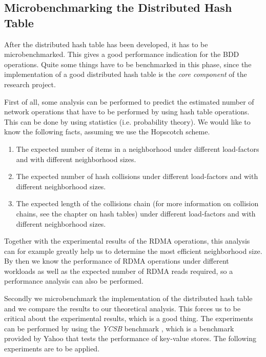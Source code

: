 \subsection{Microbenchmarking the Distributed Hash Table}
After the distributed hash table has been developed, it has to be microbenchmarked. This gives a good performance indication for the BDD operations. Quite some things have to be benchmarked in this phase, since the implementation of a good distributed hash table is the \emph{core component} of the research project. 

First of all, some analysis can be performed to predict the estimated number of network operations that have to be performed by using hash table operations. This can be done by using statistics (i.e. probability theory). We would like to know the following facts, assuming we use the Hopscotch scheme.

\begin{enumerate}
	\item The expected number of items in a neighborhood under different load-factors and with different neighborhood sizes.
	\item The expected number of hash collisions under different load-factors and with different neighborhood sizes.
	\item The expected length of the collisions chain (for more information on collision chains, see the chapter on hash tables) under different load-factors and with different neighborhood sizes.
\end{enumerate}

Together with the experimental results of the RDMA operations, this analysis can for example greatly help us to determine the most efficient neighborhood size. By then we know the performance of RDMA operations under different workloads as well as the expected number of RDMA reads required, so a performance analysis can also be performed.

Secondly we microbenchmark the implementation of the distributed hash table and we compare the results to our theoretical analysis. This forces us to be critical about the experimental results, which is a good thing. The experiments can be performed by using the \emph{YCSB} benchmark \cite{cooper2010benchmarking}, which is a benchmark provided by Yahoo that tests the performance of key-value stores. The following experiments are to be applied.

